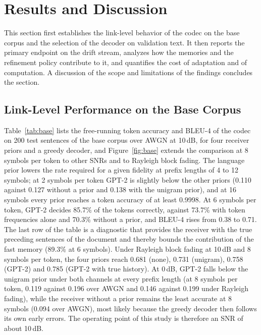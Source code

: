 \section{Results and Discussion}
\label{sec:results}

This section first establishes the link-level behavior of the codec on the base corpus and the selection of the decoder on validation text. It then reports the primary endpoint on the drift stream, analyzes how the memories and the refinement policy contribute to it, and quantifies the cost of adaptation and of computation. A discussion of the scope and limitations of the findings concludes the section.

\subsection{Link-Level Performance on the Base Corpus}
\label{sec:results-base}

Table~\ref{tab:base} lists the free-running token accuracy and BLEU-4 of the codec on 200 test sentences of the base corpus over AWGN at 10\,dB, for four receiver priors and a greedy decoder, and Figure~\ref{fig:base} extends the comparison at 8 symbols per token to other SNRs and to Rayleigh block fading. The language prior lowers the rate required for a given fidelity at prefix lengths of 4 to 12 symbols; at 2 symbols per token GPT-2 is slightly below the other priors (0.110 against 0.127 without a prior and 0.138 with the unigram prior), and at 16 symbols every prior reaches a token accuracy of at least 0.9998. At 6 symbols per token, GPT-2 decides 85.7\% of the tokens correctly, against 73.7\% with token frequencies alone and 70.3\% without a prior, and BLEU-4 rises from 0.38 to 0.71. The last row of the table is a diagnostic that provides the receiver with the true preceding sentences of the document and thereby bounds the contribution of the fast memory (89.3\% at 6 symbols). Under Rayleigh block fading at 10\,dB and 8 symbols per token, the four priors reach 0.681 (none), 0.731 (unigram), 0.758 (GPT-2) and 0.785 (GPT-2 with true history). At 0\,dB, GPT-2 falls below the unigram prior under both channels at every prefix length (at 8 symbols per token, 0.119 against 0.196 over AWGN and 0.146 against 0.199 under Rayleigh fading), while the receiver without a prior remains the least accurate at 8 symbols (0.094 over AWGN), most likely because the greedy decoder then follows its own early errors. The operating point of this study is therefore an SNR of about 10\,dB.

